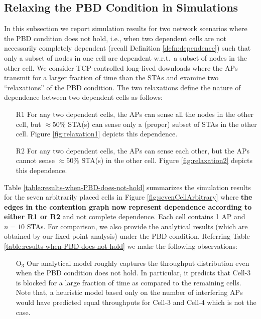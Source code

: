\documentclass[10pt,a4paper,journal]{IEEEtran}
\theoremstyle{definition}
\theoremstyle{remark}
\theoremstyle{plain}
\begin{document}
\subsection{Relaxing the PBD Condition in Simulations}
\label{subsec:when-PBD-does-not-hold}



In this subsection we report simulation results for two network scenarios where the PBD condition does not hold, i.e., when two dependent cells are not necessarily completely dependent (recall Definition \ref{defn:dependence}) such that only a subset of nodes in one cell are dependent w.r.t.~a subset of nodes in the other cell. We consider TCP-controlled long-lived downloads where the APs transmit for a larger fraction of time than the STAs and examine two ``relaxations'' of the PBD condition. The two relaxations define the nature of dependence between two dependent cells as follows:


\begin{itemize}

\item [R1] For any two dependent cells, the APs can sense all the nodes in the other cell, but $\approx 50\%$ STA(s) can sense only a (proper) subset of STAs in the other cell. Figure \ref{fig:relaxation1} depicts this dependence.

\item [R2] For any two dependent cells, the APs can sense each other, but the APs cannot sense $\approx 50\%$ STA(s) in the other cell. Figure \ref{fig:relaxation2} depicts this dependence.

\end{itemize}


Table \ref{table:results-when-PBD-does-not-hold} summarizes the simulation results for the seven arbitrarily placed cells in Figure \ref{fig:sevenCellArbitrary} where \textbf{the edges in the contention graph now represent dependence according to either R1 or R2} and not complete dependence. Each cell contains 1 AP and $n=10$ STAs. For comparison, we also provide the analytical results (which are obtained by our fixed-point analysis) under the PBD condition. Referring Table \ref{table:results-when-PBD-does-not-hold} we make the following observations:
\begin{itemize}

\item [O$_3$] Our analytical model roughly captures the throughput
  distribution even when the PBD condition does not hold.  In
  particular, it predicts that Cell-3 is blocked for a large fraction
  of time as compared to the remaining cells.  Note that, a heuristic
  model based only on the number of interfering APs would have
  predicted equal throughputs for Cell-3 and Cell-4 which is not the
  case.
\end{itemize}
\end{document}
